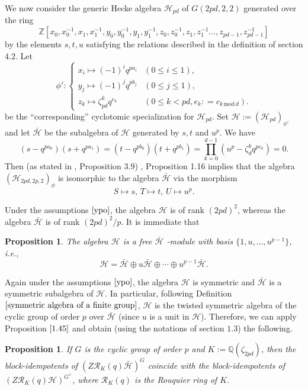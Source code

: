 \documentclass[10pt,a4paper,titlepage]{article}
\newtheorem{proposition}[theorem]{Proposition}
\begin{document}
We now consider the generic Hecke algebra $\mathcal{H}_{pd}$ of $G(2pd,2,2)$ generated over the ring
$$\mathbb{Z}[x_0,x_0^{-1},x_1,x_1^{-1},y_0,y_0^{-1},y_1,y_1^{-1},z_0,z_0^{-1},z_1,z_1^{-1}\ldots,z_{pd-1},z_{pd-1}^{-1}]$$
by the elements $s,t,u$ satisfying the relations described in the definition of section $4.2$. Let 
$$\phi' : \left\{ 
\begin{array}{ll} 
x_i \mapsto (-1)^i q^{pa_i} &(0 \leq i \leq 1),\\
y_j \mapsto (-1)^j q^{pb_j} &(0 \leq j \leq 1),\\
z_k \mapsto \zeta_{pd}^{k} q^{e_k} &(0 \leq k <pd, e_k: = c_{k \,\mathrm{mod}\,d}).  
\end{array} \right. 
$$
be the ``corresponding'' cyclotomic specialization for  $\mathcal{H}_{pd}$.
Set $\mathcal{H}:=(\mathcal{H}_{pd})_{\phi'}$ and let $\bar{\mathcal{H}}$ be the subalgebra of $\mathcal{H}$ generated by
$s,t$ and $u^p$.
We have
$$(s-q^{pa_0})(s+q^{pa_1})= (t-q^{pb_0})(t+q^{pb_1})=\prod_{k=0}^{d-1}(u^p-\zeta_d^kq^{pc_k})=0.$$
Then (as stated in \cite{Ma2}, Proposition $3.9$)
\cite{Ariki}, Proposition 1.16 implies that the algebra $(\mathcal{H}_{2pd,2p,2})_\phi$ is isomorphic to the algebra $\bar{\mathcal{H}}$ via the morphism
$$S \mapsto  s,\, T \mapsto t,\, U \mapsto u^p.$$

Under the assumptions $\ref{ypo}$, 
the algebra $\mathcal{H}$ is of rank $(2pd)^2$, whereas the algebra 
 $\bar{\mathcal{H}}$ is of rank $(2pd)^2/p$. It is immediate that
 
 \begin{proposition}\label{we can apply clifford}
 The algebra  $\mathcal{H}$ is a free  $\bar{\mathcal{H}}$ -module with basis $\{1,u,\ldots,u^{p-1}\}$, i.e.,
 $$\mathcal{H}= \bar{\mathcal{H}}  \oplus  u\bar{\mathcal{H}} \oplus \cdots \oplus u^{p-1}\bar{\mathcal{H}}.$$  
\end{proposition}

Again under the assumptions $\ref{ypo}$, the algebra $\mathcal{H}$ is symmetric and $\bar{\mathcal{H}}$ is a symmetric subalgebra of $\mathcal{H}$. In particular, following Definition $\ref{symmetric algebra of a finite group}$, $\mathcal{H}$ is the twisted symmetric algebra of the cyclic group of order $p$ over $\bar{\mathcal{H}}$ (since $u$ is a unit in $\mathcal{H}$). Therefore, we can apply Proposition $\ref{1.45}$ and obtain (using the notations of section $1.3$) the following.

\begin{proposition}\label{1}
If $G$ is the cyclic group of order $p$ and $K:=\mathbb{Q}(\zeta_{2pd})$, then the block-idempotents of $(Z\mathcal{R}_K(q)\bar{\mathcal{H}})^G$ coincide with the block-idempotents of $(Z\mathcal{R}_K(q)\mathcal{H})^{G^\vee}$, where $\mathcal{R}_K(q)$ is the Rouquier ring of $K$.
\end{proposition}
\end{document}
